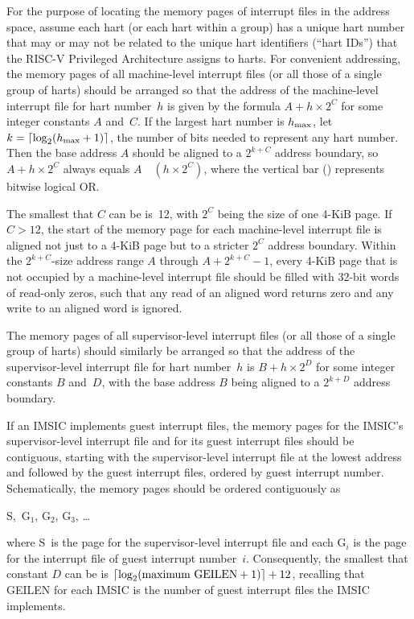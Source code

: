 For the purpose of locating the memory pages of interrupt files in the
address space, assume each hart (or each hart within a group) has a
unique hart number that may or may not be related to the unique hart
identifiers (``hart IDs'') that the RISC-V Privileged Architecture
assigns to harts.
For convenient addressing, the memory pages of all machine-level
interrupt files (or all those of a single group of harts) should be
arranged so that the address of the machine-level interrupt file for
hart number~$h$ is given by the formula ${A+h\times\mbox{2}^{C}}$ for
some integer constants $A$ and~$C$.
If the largest hart number is $h_{\rm max}$, let
${k = \lceil\log_{2}(h_{\rm max}+\mbox{1})\rceil}$, the number of bits
needed to represent any hart number.
Then the base address $A$ should be aligned to a $\mbox{2}^{k+C}$
address boundary, so ${A+h\times\mbox{2}^{C}}$ always equals
$A$~\z{|}~${(h\times\mbox{2}^{C})}$, where the vertical bar (\z{|})
represents bitwise logical OR.

The smallest that $C$ can be is~12, with $\mbox{2}^{C}$ being the size
of one \mbox{4-KiB} page.
If ${C > 12}$, the start of the memory page for each machine-level
interrupt file is aligned not just to a \mbox{4-KiB} page but to a
stricter $\mbox{2}^{C}$ address boundary.
Within the ${\mbox{2}^{k+C}}$-size address range $A$ through
${A+\mbox{2}^{k+C}-\mbox{1}}$, every \mbox{4-KiB} page that is not
occupied by a machine-level interrupt file should be filled with
\mbox{32-bit} words of read-only zeros, such that any read of an
aligned word returns zero and any write to an aligned word is ignored.

The memory pages of all supervisor-level interrupt files (or all those
of a single group of harts) should similarly be arranged so that the
address of the supervisor-level interrupt file for hart number~$h$
is ${B+h\times\mbox{2}^{D}}$ for some integer constants $B$ and~$D$,
with the base address $B$ being aligned to a $\mbox{2}^{k+D}$ address
boundary.

If an IMSIC implements guest interrupt files, the memory pages for the
IMSIC's supervisor-level interrupt file and for its guest interrupt
files should be contiguous, starting with the supervisor-level interrupt
file at the lowest address and followed by the guest interrupt files,
ordered by guest interrupt number.
Schematically, the memory pages should be ordered contiguously as
\begin{displayLinesTable}
S,\, $\mbox{G}_{1}$, $\mbox{G}_{2}$, $\mbox{G}_{3}$, \dots
\end{displayLinesTable}
where S~is the page for the supervisor-level interrupt file and each
$\mbox{G}_{i}$ is the page for the interrupt file of guest interrupt
number~$i$.
Consequently, the smallest that constant $D$ can be is
${\lceil\log_{\rm 2}(\mbox{maximum GEILEN}+\mbox{1})\rceil}+12$,
recalling that GEILEN for each IMSIC is the number of guest interrupt
files the IMSIC implements.

